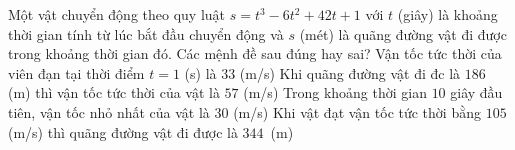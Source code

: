 \begin{ex}%
	Một vật chuyển động theo quy luật $s=t^3-6t^2+42t+1$ với $t$ (giây) là khoảng thời gian tính từ lúc bắt đầu chuyển động và $s$ (mét) là quãng đường vật đi được trong khoảng thời gian đó. Các mệnh đề sau đúng hay sai?
	\choiceTF
	{\True Vận tốc tức thời của viên đạn tại thời điểm $t=1$ (s) là $33$ (m/s)}
	{\True Khi quãng đường vật đi đc là $186$ (m) thì vận tốc tức thời của vật là $57$ (m/s)}
	{\True Trong khoảng thời gian $10$ giây đầu tiên, vận tốc nhỏ nhất của vật là $30$ (m/s)}
	{\True Khi vật đạt vận tốc tức thời bằng $105$ (m/s) thì quãng đường vật đi được là $344$~(m)}
\end{ex}

